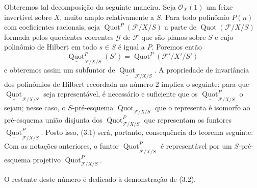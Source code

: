 Obteremos tal decomposição da seguinte maneira. Seja $\mathcal O_X(1)$ um
feixe invertível sobre $X$, muito amplo relativamente a $S$. Para todo
polinômio $P(n)$ com coeficientes racionais, seja
$\operatorname{Quot}^P(\mathcal F/X/S)$ a parte de
$\operatorname{Quot}(\mathcal F/X/S)$ formada pelos quocientes coerentes
$\mathcal G$ de $\mathcal F$ que são planos sobre $S$ e cujo polinômio de
Hilbert em todo $s\in S$ é igual a $P$. Poremos então
\[
\underline{\operatorname{Quot}}^P_{\mathcal F/X/S}(S')
=\operatorname{Quot}^P(\mathcal F'/X'/S')
\]
e obteremos assim um subfuntor de
$\underline{\operatorname{Quot}}_{\mathcal F/X/S}$. A propriedade de
invariância dos polinômios de Hilbert recordada no número 2 implica o seguinte:
para que $\underline{\operatorname{Quot}}_{\mathcal F/X/S}$ seja
representável, é necessário e suficiente que os
$\underline{\operatorname{Quot}}^P_{\mathcal F/X/S}$ o sejam; nesse caso, o
$S$-pré-esquema $\operatorname{Quot}_{\mathcal F/X/S}$ que o representa é
isomorfo ao pré-esquema união disjunta dos
$\operatorname{Quot}^P_{\mathcal F/X/S}$ que representam os funtores
$\underline{\operatorname{Quot}}^P_{\mathcal F/X/S}$. Posto isso, (3.1)
será, portanto, consequência do teorema seguinte:
 Com as notações anteriores, o funtor
$\underline{\operatorname{Quot}}^P_{\mathcal F/X/S}$ é representável por um
$S$-pré-esquema projetivo $\operatorname{Quot}^P_{\mathcal F/X/S}$.

O restante deste número é dedicado à demonstração de (3.2).


